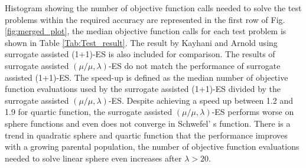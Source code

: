 Histogram showing the number of objective function calls needed to solve the test problems within the required accuracy are represented in the first row of Fig. \ref{fig:merged_plot}, the median objective function calls for each test problem is shown in Table \ref{Tab:Test_result}. The result by Kayhani and Arnold \cite{DBLP:conf/ppsn/KayhaniA18} using surrogate assisted (1+1)-ES is also included for comparison. The results of surrogate assisted $(\mu/\mu,\lambda)$-ES do not match the performance of surrogate assisted (1+1)-ES. The speed-up is defined as the median number of objective function evaluations used by the surrogate assisted (1+1)-ES \cite{DBLP:conf/ppsn/KayhaniA18} divided by the surrogate assisted $(\mu/\mu,\lambda)$-ES. Despite achieving a speed up between 1.2 and 1.9 for quartic function, the surrogate assisted $(\mu/\mu,\lambda)$-ES performs worse on sphere functions and even does not converge in Schwefel' s function. There is a trend in quadratic sphere and quartic function that the performance improves with a growing parental population, the number of objective function evaluations needed to solve linear sphere even increases after $\lambda>20$. 

